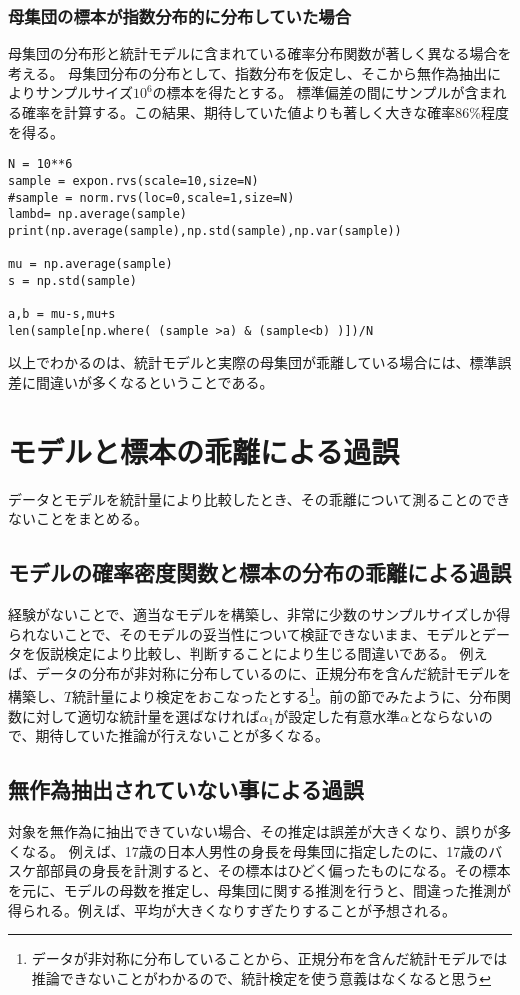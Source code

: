 \documentclass[a4paper,11pt,dvipdfmx]{jsarticle}
\begin{document}
    
\subsubsection{母集団の標本が指数分布的に分布していた場合}
母集団の分布形と統計モデルに含まれている確率分布関数が著しく異なる場合を考える。
母集団分布の分布として、指数分布を仮定し、そこから無作為抽出によりサンプルサイズ$10^6$の標本を得たとする。
標準偏差の間にサンプルが含まれる確率を計算する。この結果、期待していた値よりも著しく大きな確率$86\%$程度を得る。

\begin{lstlisting}
N = 10**6
sample = expon.rvs(scale=10,size=N)
#sample = norm.rvs(loc=0,scale=1,size=N)
lambd= np.average(sample)
print(np.average(sample),np.std(sample),np.var(sample))

mu = np.average(sample)
s = np.std(sample)

a,b = mu-s,mu+s
len(sample[np.where( (sample >a) & (sample<b) )])/N
\end{lstlisting}

以上でわかるのは、統計モデルと実際の母集団が乖離している場合には、標準誤差に間違いが多くなるということである。


\section{モデルと標本の乖離による過誤}
データとモデルを統計量により比較したとき、その乖離について測ることのできないことをまとめる。

\subsection{モデルの確率密度関数と標本の分布の乖離による過誤}
経験がないことで、適当なモデルを構築し、非常に少数のサンプルサイズしか得られないことで、そのモデルの妥当性について検証できないまま、モデルとデータを仮説検定により比較し、判断することにより生じる間違いである。
例えば、データの分布が非対称に分布しているのに、正規分布を含んだ統計モデルを構築し、$T$統計量により検定をおこなったとする\footnote{データが非対称に分布していることから、正規分布を含んだ統計モデルでは推論できないことがわかるので、統計検定を使う意義はなくなると思う}。前の節でみたように、分布関数に対して適切な統計量を選ばなければ$\alpha_1$が設定した有意水準$\alpha$とならないので、期待していた推論が行えないことが多くなる。

\subsection{無作為抽出されていない事による過誤}
対象を無作為に抽出できていない場合、その推定は誤差が大きくなり、誤りが多くなる。
例えば、17歳の日本人男性の身長を母集団に指定したのに、17歳のバスケ部部員の身長を計測すると、その標本はひどく偏ったものになる。その標本を元に、モデルの母数を推定し、母集団に関する推測を行うと、間違った推測が得られる。例えば、平均が大きくなりすぎたりすることが予想される。
\end{document}
